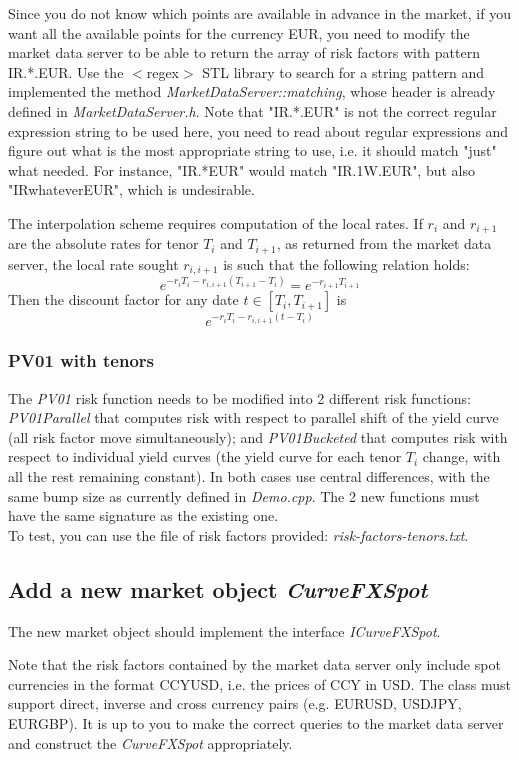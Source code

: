 \documentclass[10pt]{article}
\begin{document}
Since you do not know which points are available in advance in the market, if you want all the available points for the currency EUR, you need to modify the market data server to be able to return the array of risk factors with pattern IR.*.EUR. Use the $<$regex$>$ STL library to search for a string pattern and implemented the method \textit{MarketDataServer::matching}, whose header is already defined in \textit{MarketDataServer.h}. Note that "IR.*.EUR" is not the correct regular expression string to be used here, you need to read about regular expressions and figure out what is the most appropriate string to use, i.e. it should match "just" what needed. For instance, "IR.*EUR" would match "IR.1W.EUR", but also "IRwhateverEUR", which is undesirable.

The interpolation scheme requires computation of the local rates. If $r_i$ and $r_{i+1}$ are the absolute rates for tenor $T_i$ and $T_{i+1}$, as returned from the market data server, the local rate sought $r_{i,i+1}$ is such that the following relation holds:
 $$e^{-r_iT_i-r_{i,i+1}(T_{i+1}-T_i)}=e^{-r_{i+1}T_{i+1}}$$
Then the discount factor for any date $t \in [T_i,T_{i+1}]$ is $$e^{-r_i T_i-r_{i,i+1}(t-T_i)}$$

\subsubsection{PV01 with tenors}
\label{sec:pv01}
The \textit{PV01} risk function needs to be modified into 2 different risk functions: \textit{PV01Parallel} that computes risk with respect to parallel shift of the yield curve (all risk factor move simultaneously); and \textit{PV01Bucketed} that computes risk with respect to individual yield curves (the yield curve for each tenor $T_i$ change, with all the rest remaining constant). In both cases use central differences, with the same bump size as currently defined in \textit{Demo.cpp}. The 2 new functions must have the same signature as the existing one. \\

To test, you can use the file of risk factors provided: \textit{risk-factors-tenors.txt}.

\subsection{Add a new market object \textit{CurveFXSpot}}
The new market object should implement the interface \textit{ICurveFXSpot}.

Note that the risk factors contained by the market data server only include spot currencies in the format CCYUSD, i.e. the prices of CCY in USD. The class must support direct, inverse and cross currency pairs (e.g. EURUSD, USDJPY, EURGBP). It is up to you to make the correct queries to the market data server and construct the \textit{CurveFXSpot} appropriately.\\
\end{document}
